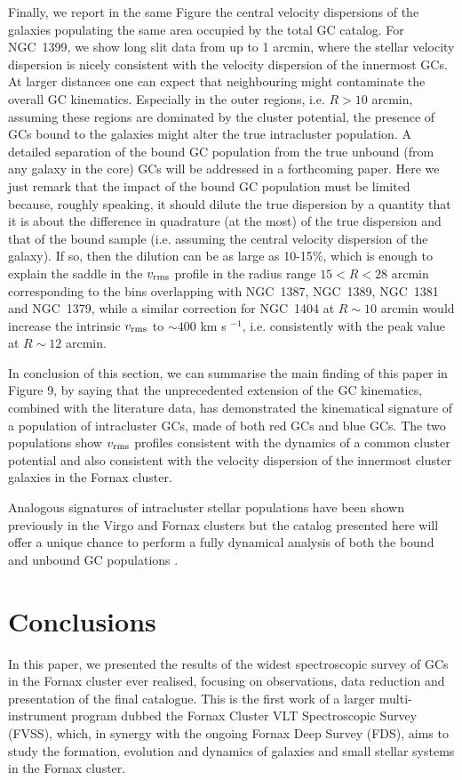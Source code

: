 \documentclass[useAMS,usenatbib]{mn2e}
\begin{document}
Finally, we report in the same Figure the central velocity dispersions of 
the galaxies populating the same area occupied by the total GC catalog. 
For NGC~1399, we show long slit data from \citet{Saglia00} up 
to 1 arcmin, where the stellar velocity dispersion is nicely consistent with
the velocity dispersion of the innermost GCs.
At larger distances one can expect that neighbouring 
might contaminate the overall GC kinematics. Especially in the outer regions, 
i.e. $R>10$ arcmin, assuming these regions are dominated by the cluster 
potential, the presence of GCs bound to the galaxies might alter the true  
intracluster population. A detailed separation of the bound GC population from 
the true unbound (from any galaxy in the core) GCs will be addressed in a 
forthcoming paper. Here we just remark that the impact of the bound GC 
population must be limited because, roughly speaking, it should dilute the true 
dispersion by a quantity that it is about the difference in quadrature (at the 
most) of the true dispersion and that of the bound sample (i.e. assuming the 
central velocity dispersion of the galaxy). If so, then the dilution can be as 
large as 10-15$\%$, which is enough to explain the saddle in the $v_{\rm rms}$ 
profile in the radius range $15<R<28$ arcmin corresponding to the bins 
overlapping with NGC~1387, NGC~1389, NGC~1381 and NGC~1379, while a similar 
correction for NGC~1404 at $R\sim10$ arcmin would increase the intrinsic $v_{\rm 
rms}$ to $\sim400$ km s $^{-1}$, i.e. consistently with the peak value at 
$R\sim 12$ arcmin.

In conclusion of this section, we can summarise the main finding of this paper 
in Figure 9, by saying that the unprecedented extension of the GC kinematics, 
combined with the literature data, has demonstrated the kinematical signature 
of a population of intracluster GCs, made of both red GCs and blue GCs. The two 
populations show $v_{\rm rms}$ profiles consistent with the dynamics of a 
common cluster potential and also consistent with the velocity dispersion of 
the innermost cluster galaxies in the Fornax cluster. 

Analogous signatures of intracluster stellar populations have been shown 
previously in the Virgo and Fornax clusters \citep[see e.g., ][]{Paolillo02, Arnaboldi04, 
Longobardi15} but the catalog presented here will offer a unique 
chance to perform a fully dynamical analysis of both the bound and unbound GC 
populations \citep{DAbrusco16}.

\section{Conclusions}
\label{sec:conclusions}
In this paper, we presented the results of the widest spectroscopic survey of 
GCs in the Fornax cluster ever realised, focusing on observations, data 
reduction and presentation of the final catalogue. This is the first work of a 
larger multi-instrument program dubbed the Fornax Cluster VLT Spectroscopic 
Survey (FVSS), which, in synergy with the ongoing Fornax Deep Survey (FDS), 
aims to study the formation, evolution and dynamics of galaxies and small 
stellar systems in the Fornax cluster.
\end{document}

